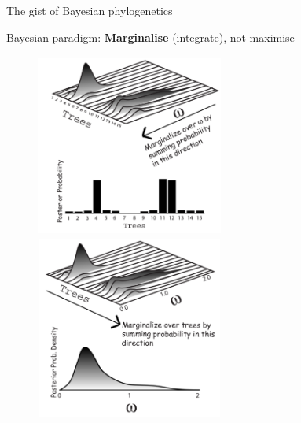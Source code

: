 \documentclass[newPxFont,numfooter,sectionpages]{beamer}
\begin{document}
\begin{frame}{The gist of Bayesian phylogenetics}
\begin{block}{Bayesian paradigm:}
 \textbf{Marginalise} (integrate), not maximise
\end{block}
\vspace{2em}
\begin{figure}
	\centerline{
	\includegraphics[width=0.55\textwidth,height=6cm]{figures/Joint_trees_omega_marg1.pdf} \\ 
	\includegraphics[width=0.55\textwidth,height=6cm]{figures/Joint_trees_omega_marg2.pdf}
	}
\end{figure}
\end{frame}
\end{document}
